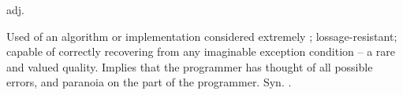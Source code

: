  adj.

Used of an algorithm or implementation considered extremely ;
lossage-resistant; capable of correctly recovering from any imaginable exception
condition -- a rare and valued quality. Implies that the programmer has thought
of all possible errors, and paranoia on the part of the programmer. Syn.
.

